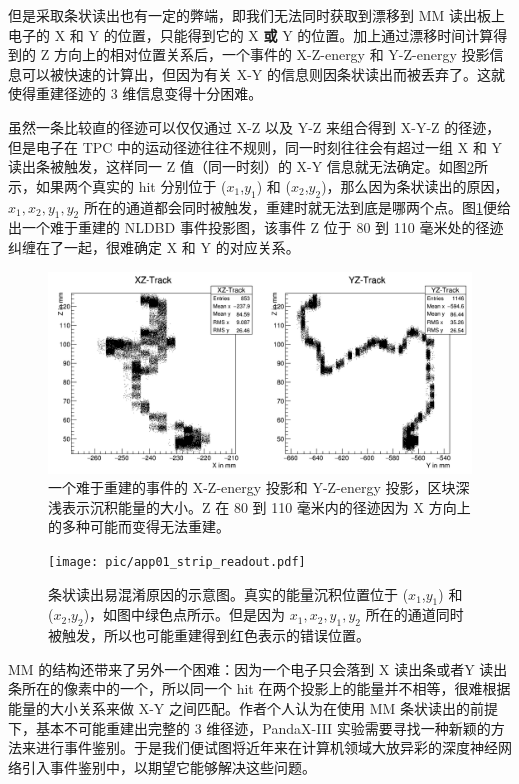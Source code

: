 但是采取条状读出也有一定的弊端，即我们无法同时获取到漂移到 MM 读出板上电子的 X 和 Y 的位置，只能得到它的 X \textbf{或} Y 的位置。加上通过漂移时间计算得到的 Z 方向上的相对位置关系后，一个事件的 X-Z-energy 和 Y-Z-energy 投影信息可以被快速的计算出，但因为有关 X-Y 的信息则因条状读出而被丢弃了。这就使得重建径迹的 3 维信息变得十分困难。

虽然一条比较直的径迹可以仅仅通过 X-Z 以及 Y-Z 来组合得到 X-Y-Z 的径迹，但是电子在 TPC 中的运动径迹往往不规则，同一时刻往往会有超过一组 X 和 Y 读出条被触发，这样同一 Z 值（同一时刻）的 X-Y 信息就无法确定。如图\ref{fig:difficulty_track_2}所示，如果两个真实的 hit 分别位于 ($x_1$,$y_1$) 和 ($x_2$,$y_2$)，那么因为条状读出的原因，$x_1,x_2,y_1,y_2$ 所在的通道都会同时被触发，重建时就无法到底是哪两个点。图\ref{fig:difficulty_track}便给出一个难于重建的 NLDBD 事件投影图，该事件 Z 位于 80 到 110 毫米处的径迹纠缠在了一起，很难确定 X 和 Y 的对应关系。

\begin{figure}
    \centering
    \includegraphics[width=0.7\columnwidth]{pic/difficulty_track.png}
    \caption{一个难于重建的事件的 X-Z-energy 投影和 Y-Z-energy 投影，区块深浅表示沉积能量的大小。Z 在 80 到 110 毫米内的径迹因为 X 方向上的多种可能而变得无法重建。}
    \label{fig:difficulty_track}
\end{figure}

\begin{figure}
    \centering
    \texttt{[image: pic/app01\_strip\_readout.pdf]}
    \caption{条状读出易混淆原因的示意图。真实的能量沉积位置位于 ($x_1$,$y_1$) 和 ($x_2$,$y_2$)，如图中绿色点所示。但是因为 $x_1,x_2,y_1,y_2$ 所在的通道同时被触发，所以也可能重建得到红色表示的错误位置。}
    \label{fig:difficulty_track_2}
\end{figure}

MM 的结构还带来了另外一个困难：因为一个电子只会落到 X 读出条或者Y 读出条所在的像素中的一个，所以同一个 hit 在两个投影上的能量并不相等，很难根据能量的大小关系来做 X-Y 之间匹配。作者个人认为在使用 MM 条状读出的前提下，基本不可能重建出完整的 3 维径迹，PandaX-III 实验需要寻找一种新颖的方法来进行事件鉴别。于是我们便试图将近年来在计算机领域大放异彩的深度神经网络引入事件鉴别中，以期望它能够解决这些问题。

